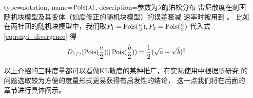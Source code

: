 {
  type=notation,
  name={$\operatorname{Pois}(\lambda)$},
  description={参数为$\lambda$的泊松分布}
}
雷尼散度在刻画随机块模型及其变体（如度修正的随机块模型）的误差衰减
速率时被用到 \cite{zhang2016, gao2018community}。
比如在两社团的随机块模型中，我们取$P_1=\operatorname{Pois}(\frac{a}{2}),P_2=\operatorname{Pois}(\frac{b}{2})$
代入式 \eqref{eq:renyi_divergence} 
得
\begin{equation}\label{eq:renyi_d12_ab}
  D_{1/2}(\operatorname{Pois}(\frac{a}{2}) || \operatorname{Pois}(\frac{b}{2}))
  = \frac{1}{2}(\sqrt{a} - \sqrt{b})^2
\end{equation}

以上介绍的三种度量都可以看做KL散度的某种推广，在实际使用中根据所研究
的问题选取较为方便的度量形式更易获得有启发性的结论，
这一点我们将在后面的章节进行具体阐示。
